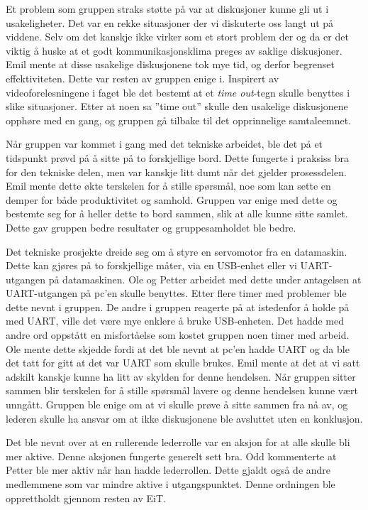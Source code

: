 Et problem som gruppen straks støtte på var at diskusjoner kunne gli ut i usakeligheter. 
Det var en rekke situasjoner der vi diskuterte oss langt ut på viddene. 
Selv om det kanskje ikke virker som et stort problem der og da er det viktig å huske at et godt kommunikasjonsklima preges av saklige diskusjoner\citep{levin}. 
Emil mente at disse usakelige diskusjonene tok mye tid, og derfor begrenset effektiviteten. 
Dette var resten av gruppen enige i. 
Inspirert av videoforelesningene i faget\citep{video} ble det bestemt at et \textit{time out}-tegn skulle benyttes i slike situasjoner. 
Etter at noen sa ''time out'' skulle den usakelige diskusjonene opphøre med en gang, og gruppen gå tilbake til det opprinnelige samtaleemnet. 
\vspace{\secspace}

Når gruppen var kommet i gang med det tekniske arbeidet, ble det på et tidspunkt prøvd på å sitte på to forskjellige bord. 
Dette fungerte i praksiss bra for den tekniske delen, men var kanskje litt dumt når det gjelder prosessdelen. 
Emil mente dette økte terskelen for å stille spørsmål, noe som kan sette en demper for både produktivitet og samhold. 
Gruppen var enige med dette og bestemte seg for å heller dette to bord sammen, slik at alle kunne sitte samlet. 
Dette gav gruppen bedre resultater og gruppesamholdet ble bedre.
\vspace{\secspace}

Det tekniske prosjekte dreide seg om å styre en servomotor fra en datamaskin. 
Dette kan gjøres på to forskjellige måter, via en USB-enhet eller vi UART-utgangen på datamaskinen. 
Ole og Petter arbeidet med dette under antagelsen at UART-utgangen på pc'en skulle benyttes. 
Etter flere timer med problemer ble dette nevnt i gruppen. 
De andre i gruppen reagerte på at istedenfor å holde på med UART, ville det være mye enklere å bruke USB-enheten. 
Det hadde med andre ord oppstått en misfortåelse som kostet gruppen noen timer med arbeid. 
Ole mente dette skjedde fordi at det ble nevnt at pc'en hadde UART og da ble det tatt for gitt at det var UART som skulle brukes. 
Emil mente at det at vi satt adskilt kanskje kunne ha litt av skylden for denne hendelsen. 
Når gruppen sitter sammen blir terskelen for å stille spørsmål lavere og denne hendelsen kunne vært unngått. 
Gruppen ble enige om at vi skulle prøve å sitte sammen fra nå av, og lederen skulle ha ansvar om at ikke diskusjonene ble avsluttet uten en konklusjon. 
\vspace{\secspace}

Det ble nevnt over at en rullerende lederrolle var en aksjon for at alle skulle bli mer aktive. 
Denne aksjonen fungerte generelt sett bra. 
Odd kommenterte at Petter ble mer aktiv når han hadde lederrollen. 
Dette gjaldt også de andre medlemmene som var mindre aktive i utgangspunktet. 
Denne ordningen ble opprettholdt gjennom resten av EiT. 
\vspace{\secspace}

